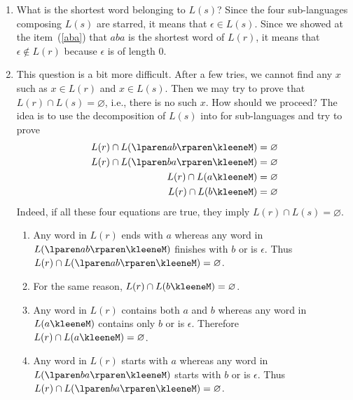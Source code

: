 \begin{enumerate}
    \item What is the shortest word belonging to \(L(s)\)?  Since the
      four sub-languages composing \(L(s)\) are starred, it means that
      \(\epsilon \in L(s)\). Since we showed at the item~(\ref{aba})
      that \(aba\) is the shortest word of \(L(r)\), it means that
      \(\epsilon \not\in L(r)\) because \(\epsilon\) is of length
      \(0\).

    \item This question is a bit more difficult. After a few tries, we
      cannot find any \(x\) such as \(x \in L(r)\) and \(x \in
      L(s)\). Then we may try to prove that \(L(r) \cap L(s) =
      \varnothing\), i.e., there is no such \(x\). How should we
      proceed? The idea is to use the decomposition of \(L(s)\) into
      for sub-languages and try to prove
      \begin{align*}
        L(r) \cap L(\lparen ab \rparen\kleeneM) &= \varnothing\\
        L(r) \cap L(\lparen ba \rparen\kleeneM) &= \varnothing\\
        L(r) \cap L(a\kleeneM) &= \varnothing\\
        L(r) \cap L(b\kleeneM) &= \varnothing
      \end{align*}
      Indeed, if all these four equations are true, they imply
        \(L(r) \cap L(s) = \varnothing\).
      \begin{enumerate}

        \item Any word in \(L(r)\) ends with \(a\) whereas any word in
          \(L(\lparen ab \rparen\kleeneM)\) finishes with \(b\) or is
          \(\epsilon\). Thus \(L(r) \cap L(\lparen ab \rparen\kleeneM)
          = \varnothing\).

        \item For the same reason, \(L(r) \cap L(b\kleeneM) =
          \varnothing\).
 
        \item Any word in \(L(r)\) contains both \(a\) and \(b\)
          whereas any word in \(L(a\kleeneM)\) contains only \(b\) or
          is \(\epsilon\). Therefore \(L(r) \cap L(a\kleeneM) =
          \varnothing\).

        \item Any word in \(L(r)\) starts with \(a\) whereas any word
          in \(L(\lparen ba \rparen\kleeneM)\) starts with \(b\) or is
          \(\epsilon\). Thus \(L(r) \cap L(\lparen ba \rparen\kleeneM)
          = \varnothing\).


\end{enumerate}
\end{enumerate}
